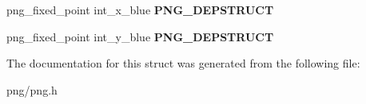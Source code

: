 \begin{DoxyCompactItemize}
\item 
png\+\_\+fixed\+\_\+point int\+\_\+x\+\_\+blue {\bfseries P\+N\+G\+\_\+\+D\+E\+P\+S\+T\+R\+U\+CT}\hypertarget{structpng__info__struct_a97f53728858a190792c786fd5cae5686}{}\label{structpng__info__struct_a97f53728858a190792c786fd5cae5686}

\item 
png\+\_\+fixed\+\_\+point int\+\_\+y\+\_\+blue {\bfseries P\+N\+G\+\_\+\+D\+E\+P\+S\+T\+R\+U\+CT}\hypertarget{structpng__info__struct_aba85bee37b3777fedceb9daf123ca060}{}\label{structpng__info__struct_aba85bee37b3777fedceb9daf123ca060}

\end{DoxyCompactItemize}


The documentation for this struct was generated from the following file\+:\begin{DoxyCompactItemize}
\item 
png/png.\+h\end{DoxyCompactItemize}
